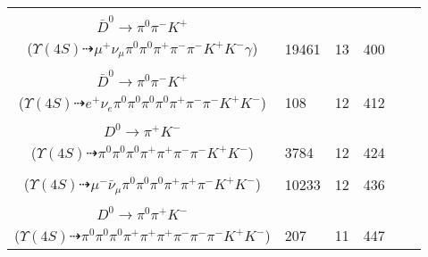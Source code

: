 \documentclass[landscape]{article}
\newcounter{rownumbers}
\newcommand\rn{\stepcounter{rownumbers}\arabic{rownumbers}}
\newcommand{\EOLP}{\\ \hline} %
\newcommand{\topoTags}[1]{#1} %
\begin{document}
\begin{longtable}{clcccc}
\rn & \makecell[l]{ $ 
\Upsilon(4S) \rightarrow B^{+} B^{-} ,
B^{+} \rightarrow \mu^{+} \nu_{\mu} \bar{D}^{*0} ,
B^{-} \rightarrow \rho^{-} D^{0} ,
\bar{D}^{*0} \rightarrow \bar{D}^{0} \gamma ,
\rho^{-} \rightarrow \pi^{0} \pi^{-} ,
D^{0} \rightarrow \pi^{+} K^{-} ,
$ \\ $
\bar{D}^{0} \rightarrow \pi^{0} \pi^{-} K^{+} 
$ \\ ($
\Upsilon(4S) \dashrightarrow \mu^{+} \nu_{\mu} \pi^{0} \pi^{0} \pi^{+} \pi^{-} \pi^{-} K^{+} K^{-} \gamma 
$) } & \topoTags{19461 & }13 & 400 \EOLP

\rn & \makecell[l]{ $ 
\Upsilon(4S) \rightarrow B^{+} B^{-} ,
B^{+} \rightarrow e^{+} \nu_{e} \bar{D}^{*0} ,
B^{-} \rightarrow \rho^{-} D^{0} ,
\bar{D}^{*0} \rightarrow \pi^{0} \bar{D}^{0} ,
\rho^{-} \rightarrow \pi^{0} \pi^{-} ,
D^{0} \rightarrow \pi^{0} \pi^{+} K^{-} ,
$ \\ $
\bar{D}^{0} \rightarrow \pi^{0} \pi^{-} K^{+} 
$ \\ ($
\Upsilon(4S) \dashrightarrow e^{+} \nu_{e} \pi^{0} \pi^{0} \pi^{0} \pi^{0} \pi^{+} \pi^{-} \pi^{-} K^{+} K^{-} 
$) } & \topoTags{108 & }12 & 412 \EOLP

\rn & \makecell[l]{ $ 
\Upsilon(4S) \rightarrow B^{+} B^{-} ,
B^{+} \rightarrow \rho^{+} \bar{D}^{0} ,
B^{-} \rightarrow \rho^{-} D^{0} ,
\rho^{+} \rightarrow \pi^{0} \pi^{+} ,
\bar{D}^{0} \rightarrow \pi^{0} \pi^{-} K^{+} ,
\rho^{-} \rightarrow \pi^{0} \pi^{-} ,
$ \\ $
D^{0} \rightarrow \pi^{+} K^{-} 
$ \\ ($
\Upsilon(4S) \dashrightarrow \pi^{0} \pi^{0} \pi^{0} \pi^{+} \pi^{+} \pi^{-} \pi^{-} K^{+} K^{-} 
$) } & \topoTags{3784 & }12 & 424 \EOLP

\rn & \makecell[l]{ $ 
\Upsilon(4S) \rightarrow B^{+} B^{-} ,
B^{+} \rightarrow \rho^{+} \bar{D}^{0} ,
B^{-} \rightarrow \mu^{-} \bar{\nu}_{\mu} D^{0} ,
\rho^{+} \rightarrow \pi^{0} \pi^{+} ,
\bar{D}^{0} \rightarrow \pi^{0} \pi^{-} K^{+} ,
D^{0} \rightarrow \pi^{0} \pi^{+} K^{-} 
$ \\ ($
\Upsilon(4S) \dashrightarrow \mu^{-} \bar{\nu}_{\mu} \pi^{0} \pi^{0} \pi^{0} \pi^{+} \pi^{+} \pi^{-} K^{+} K^{-} 
$) } & \topoTags{10233 & }12 & 436 \EOLP

\rn & \makecell[l]{ $ 
\Upsilon(4S) \rightarrow B^{+} B^{-} ,
B^{+} \rightarrow \rho^{+} \bar{D}^{0} ,
B^{-} \rightarrow \pi^{0} \pi^{-} \pi^{-} D^{*+} ,
\rho^{+} \rightarrow \pi^{0} \pi^{+} ,
\bar{D}^{0} \rightarrow \pi^{-} K^{+} ,
D^{*+} \rightarrow \pi^{+} D^{0} ,
$ \\ $
D^{0} \rightarrow \pi^{0} \pi^{+} K^{-} 
$ \\ ($
\Upsilon(4S) \dashrightarrow \pi^{0} \pi^{0} \pi^{0} \pi^{+} \pi^{+} \pi^{+} \pi^{-} \pi^{-} \pi^{-} K^{+} K^{-} 
$) } & \topoTags{207 & }11 & 447 \EOLP


\end{longtable}
\end{document}

